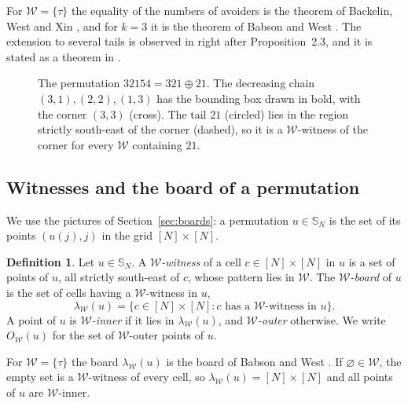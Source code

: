 \documentclass[11pt]{amsart}
\theoremstyle{definition}
\newtheorem{definition}[theorem]{Definition}
\theoremstyle{remark}
\newcommand{\bS}{\mathbb{S}}
\newcommand{\cW}{\mathcal{W}}
\newcommand{\gridlines}[2]{\draw[gray!55,very thin] (0,0) grid (#1,-#2);}
\newcommand{\pt}[2]{\fill (#2-0.5,0.5-#1) circle (0.16);}
\newcommand{\crosscell}[2]{\draw[thick] (#2-0.8,0.2-#1) -- (#2-0.2,0.8-#1); \draw[thick] (#2-0.8,0.8-#1) -- (#2-0.2,0.2-#1);}
\newcommand{\wit}[2]{\draw[thick] (#2-0.5,0.5-#1) circle (0.34);}
\begin{document}
For $\cW=\{\tau\}$ the equality of the numbers of avoiders is the theorem of Backelin, West and Xin \cite{BWX}, and for $k=3$ it is the theorem of Babson and West \cite{BW}. The extension to several tails is observed in \cite{BWX} right after Proposition~2.3, and it is stated as a theorem in \cite[Theorem~2]{BHKZ}.

\begin{figure}[ht]
\centering
{}
\caption{The permutation $32154=321\oplus21$. The decreasing chain $(3,1),(2,2),(1,3)$ has the bounding box drawn in bold, with the corner $(3,3)$ (cross). The tail $21$ (circled) lies in the region strictly south-east of the corner (dashed), so it is a $\cW$-witness of the corner for every $\cW$ containing $21$.}\label{fig:occurrence}
\end{figure}

\subsection{Witnesses and the board of a permutation}\label{sec:witness}

We use the pictures of Section~\ref{sec:boards}: a permutation $u\in\bS_N$ is the set of its points $(u(j),j)$ in the grid $[N]\times[N]$.

\begin{definition}\label{def:witness}
Let $u\in\bS_N$. A \emph{$\cW$-witness} of a cell $c\in[N]\times[N]$ in $u$ is a set of points of $u$, all strictly south-east of $c$, whose pattern lies in $\cW$. The \emph{$\cW$-board} of $u$ is the set of cells having a $\cW$-witness in $u$,
\[
\lambda_\cW(u)=\bigl\{c\in[N]\times[N]:c\text{ has a }\cW\text{-witness in }u\bigr\}.
\]
A point of $u$ is \emph{$\cW$-inner} if it lies in $\lambda_\cW(u)$, and \emph{$\cW$-outer} otherwise. We write $O_\cW(u)$ for the set of $\cW$-outer points of $u$.
\end{definition}

For $\cW=\{\tau\}$ the board $\lambda_\cW(u)$ is the board of Babson and West \cite{BW}. If $\varnothing\in\cW$, the empty set is a $\cW$-witness of every cell, so $\lambda_\cW(u)=[N]\times[N]$ and all points of $u$ are $\cW$-inner.
\end{document}
